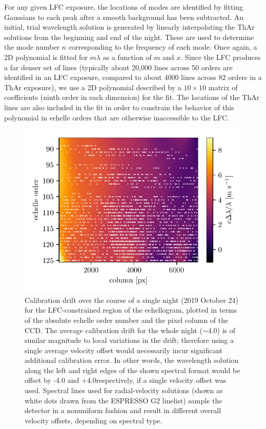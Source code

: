 For any given LFC exposure, the locations of modes are identified by fitting Gaussians to each peak after a smooth background has been subtracted. An initial, trial wavelength solution is generated by linearly interpolating the ThAr solutions from the beginning and end of the night. These are used to determine the mode number \(n\) corresponding to the frequency of each mode. Once again, a 2D polynomial is fitted for \(m\lambda\) as a function of \(m\) and \(x\). Since the LFC produces a far denser set of lines (typically about 20,000 lines across 50 orders are identified in an LFC exposure, compared to about 4000 lines across 82 orders in a ThAr exposure), we use a 2D polynomial described by a $10\times10$ matrix of coefficients (ninth order in each dimension) for the fit. The locations of the ThAr lines are also included in the fit in order to constrain the behavior of this polynomial in echelle orders that are otherwise inaccessible to the LFC.

\begin{figure}[htbp]
    \centering
    \includegraphics[width=\textwidth]{figures-4/drift.pdf}
    \caption{Calibration drift over the course of a single night (2019 October 24) for the LFC-constrained region of the echellogram, plotted in terms of the absolute echelle order number and the pixel column of the CCD. The average calibration drift for the whole night ($\sim$4.0\ms) is of similar magnitude to local variations in the drift; therefore using a single average velocity offset would necessarily incur significant additional calibration error. In other words, the wavelength solution along the left and right edges of the shown spectral format would be offset by -4.0 and +4.0\ms respectively, if a single velocity offset was used. Spectral lines used for radial-velocity solutions (shown as white dots drawn from the ESPRESSO G2 linelist) sample the detector in a nonuniform fashion and result in different overall velocity offsets, depending on spectral type.}
    \label{fig:caldrift}
\end{figure}

